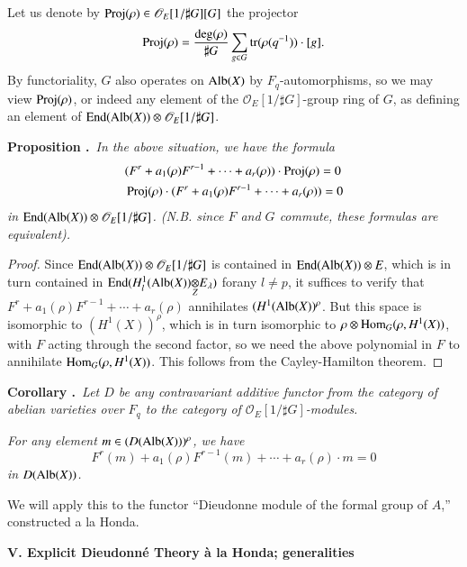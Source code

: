 Let us denote by $\operatorname{Proj}(\rho)\in \mathscr{O}_{E}[1/\sharp G][G]$ the projector
$$
\operatorname{Proj} (\rho)=\dfrac{\deg (\rho)}{\sharp G}\sum\limits_{g\in G}\operatorname{tr}(\rho(q^{-1}))\cdot [g].
$$
By functoriality, $G$ also operates on $\operatorname{Alb}(X)$ by $F_{q}$-automorphisms, so we may view $\operatorname{Proj}(\rho)$, or indeed any element of the $\mathscr{O}_{E}[1/\sharp G]$-group ring of $G$, as defining an element of $\operatorname{End}(\operatorname{Alb}(X))\otimes \mathscr{O}_{E}[1/\sharp G]$.

\medskip
\noindent
{\bf Proposition .\label{art6-prop4.2}}~{\em In the above situation, we have the formula}
\begin{align*}
& (F^{r}+a_{1}(\rho)F^{r-1}+\cdots+a_{r}(\rho))\cdot \operatorname{Proj} (\rho)=0\\
& \operatorname{Proj} (\rho)\cdot (F^{r}+a_{1}(\rho)F^{r-1}+\cdots+a_{r}(\rho))=0
\end{align*}
{\em in $\operatorname{End}(\operatorname{Alb}(X))\otimes \mathscr{O}_{E}[1/\sharp G]$. (N.B. since $F$ and $G$ commute, these formulas are equivalent).}

\begin{proof}
Since $\operatorname{End}(\operatorname{Alb}(X))\otimes \mathscr{O}_{E}[1/\sharp G]$ is contained in $\operatorname{End}(\operatorname{Alb}(X))\otimes E$, which is in turn contained in $\End(\foprod{H^{1}_{l}(\Alb(X))}{E_{\lambda}}{Z})$ for\pageoriginale any $l\neq p$, it suffices to verify that $F^{r}+a_{1}(\rho)F^{r-1}+\cdots+a_{r}(\rho)$ annihilates $(H^{1}(\operatorname{Alb}(X))^{\rho}$. But this space is isomorphic to $(H^{1}(X))^{\rho}$, which is in turn isomorphic to $\rho\otimes \operatorname{Hom}_{G}(\rho,H^{1}(X))$, with $F$ acting through the second factor, so we need the above polynomial in $F$ to annihilate $\operatorname{Hom}_{G}(\rho,H^{1}(X))$. This follows from the Cayley-Hamilton theorem.
\end{proof}

\medskip
\noindent
{\bf Corollary .\label{art6-coro4.3}}~{\em Let $D$ be any contravariant additive functor from the category of abelian varieties over $F_{q}$ to the category of $\mathscr{O}_{E}[1/\sharp G]$-modules.}

{\em For any element $m\in (D(\operatorname{Alb}(X)))^{\rho}$, we have}
$$
F^{r}(m)+a_{1}(\rho)F^{r-1}(m)+\cdots+a_{r}(\rho)\cdot m=0
$$
{\em in $D(\operatorname{Alb}(X))$.}
\smallskip

We will apply this to the functor ``Dieudonne module of the formal group of $A$,'' constructed a la Honda.

\bigskip
\noindent
{\bf V. Explicit Dieudonn\'e Theory \`a la Honda; generalities}
\smallskip

